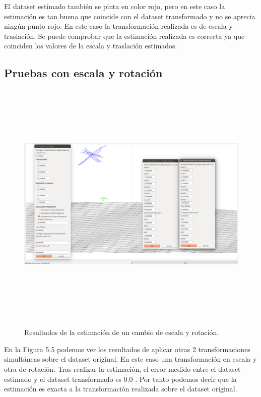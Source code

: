 El dataset estimado también se pinta en color rojo, pero en este caso la estimación es tan buena que coincide con el dataset transformado y no se aprecia ningún punto rojo.
En este caso la transformación realizada es de escala y traslación. Se puede comprobar que la estimación realizada es correcta ya que coinciden los valores de la escala y traslación estimados.

\subsection{Pruebas con escala y rotación}

\begin{figure}
\begin{center}
\label{fig:escalaRotationTest}\includegraphics[height=12.0cm,width=18.0cm]{img/cap6/Escala_Rotation_abba.png}
\hspace{0.5cm}

\end{center}

\caption{Resultados de la estimación de un cambio de escala y rotación.}
\end{figure}
En la Figura 5.5 podemos ver los resultados de aplicar otras 2 transformaciones simultáneas sobre el dataset original. En este caso una transformación en escala y otra de rotación. Tras realizar la estimación, el error medido entre el dataset estimado y el dataset transformado es 0.0 . Por tanto podemos decir que la estimación es exacta a la transformación realizada sobre el dataset original.

